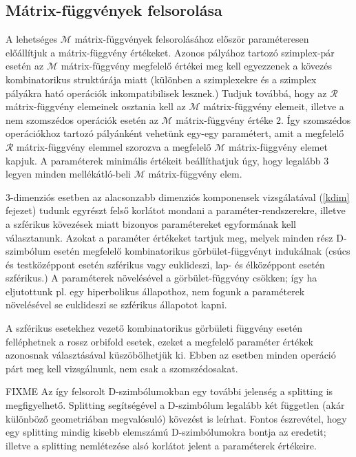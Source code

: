 \documentclass[12pt,magyar,a4paper]{article}
\begin{document}
\subsection{Mátrix-függvények felsorolása}
\label{mxfv}

A lehetséges $\mathcal{M}$ mátrix-függvények felsorolásához először paraméteresen
előállítjuk a mátrix-függvény értékeket. Azonos pályához tartozó szimplex-pár
esetén az $\mathcal{M}$ mátrix-függvény megfelelő értékei meg kell egyezzenek a
kövezés kombinatorikus struktúrája miatt (különben a szimplexekre és a szimplex
pályákra ható operációk inkompatibilisek lesznek.) Tudjuk továbbá, hogy az
$\mathcal{R}$ mátrix-függvény elemeinek osztania kell az $\mathcal{M}$
mátrix-függvény elemeit, illetve a nem szomszédos operációk esetén az
$\mathcal{M}$ mátrix-függvény értéke 2. Így szomszédos operációkhoz tartozó
pályánként vehetünk egy-egy paramétert, amit a megfelelő $\mathcal{R}$
mátrix-függvény elemmel szorozva a megfelelő $\mathcal{M}$ mátrix-függvény
elemet kapjuk. A paraméterek minimális értékeit beállíthatjuk úgy, hogy legalább
$3$ legyen minden mellékátló-beli $\mathcal{M}$ mátrix-függvény elem.

$3$-dimenziós esetben az alacsonzabb dimenziós komponensek vizsgálatával
(\ref{kdim} fejezet) tudunk egyrészt felső korlátot mondani a
paraméter-rendszerekre, illetve a szférikus kövezések miatt bizonyos
paramétereket egyformának kell választanunk. Azokat a paraméter értékeket
tartjuk meg, melyek minden rész D-szimbólum esetén megfelelő kombinatorikus
görbület-függvényt indukálnak (csúcs és testközéppont esetén szférikus vagy
euklideszi, lap- és élközéppont esetén szférikus.) A paraméterek növelésével a
görbület-függvény csökken; így ha eljutottunk pl. egy hiperbolikus állapothoz,
nem fogunk a paraméterek növelésével se euklideszi se szférikus állapotot kapni.

A szférikus esetekhez vezető kombinatorikus görbületi függvény esetén
felléphetnek a rossz orbifold esetek, ezeket a megfelelő paraméter értékek
azonosnak választásával küszöbölhetjük ki. Ebben az esetben minden operáció párt
meg kell vizsgálnunk, nem csak a szomszédosakat.

FIXME \cite{abc} Az így felsorolt D-szimbólumokban egy további jelenség a
splitting is megfigyelhető. Splitting segítségével a D-szimbólum legalább két
független (akár különböző geometriában megvalósuló) kövezést is leírhat. Fontos
észrevétel, hogy egy splitting mindig kisebb elemszámú D-szimbólumokra bontja az
eredetit; illetve a splitting nemlétezése alsó korlátot jelent a paraméterek
értékeire.
\end{document}
